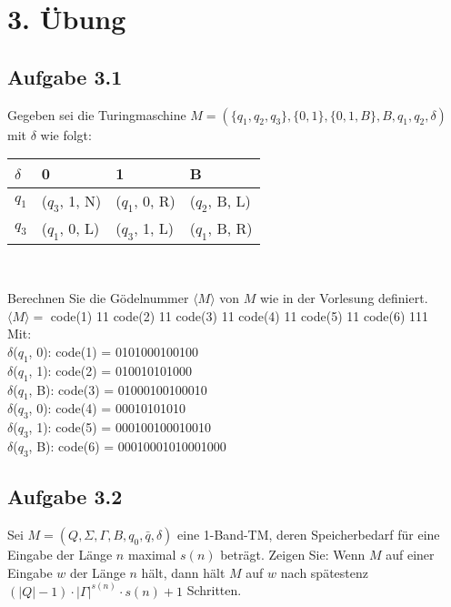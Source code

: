 \section*{3. Übung}
\subsection*{Aufgabe 3.1}
Gegeben sei die Turingmaschine $M=(\{q_1, q_2, q_3\}, \{0,1\}, \{0,1,B\}, B, q_1, q_2, \delta)$ mit $\delta$ wie folgt:
\begin{center}
	\begin{tabular}{l|lll}
		$\delta$ & \hspace{0.6cm}0 & \hspace{0.6cm}1 & \hspace{0.6cm}B \\ \hline
		$q_1$ & ($q_3$, 1, N) & ($q_1$, 0, R) & ($q_2$, B, L) \\
		$q_3$ & ($q_1$, 0, L) & ($q_3$, 1, L) & ($q_1$, B, R)
	\end{tabular}\\
\end{center}
Berechnen Sie die Gödelnummer $\langle M \rangle$ von $M$ wie in der Vorlesung definiert.
\\

$\langle M \rangle = $ code(1) 11 code(2) 11 code(3) 11 code(4) 11 code(5) 11 code(6) 111
\\

Mit:
\\
$\delta$($q_{1}$, 0): code(1) = 0101000100100
\\
$\delta$($q_{1}$, 1): code(2) = 010010101000
\\
$\delta$($q_{1}$, B): code(3) = 01000100100010
\\
$\delta$($q_{3}$, 0): code(4) = 00010101010
\\
$\delta$($q_{3}$, 1): code(5) = 000100100010010
\\
$\delta$($q_{3}$, B): code(6) = 00010001010001000
\\


\subsection*{Aufgabe 3.2}
Sei $M = (Q, \Sigma, \Gamma, B, q_0, \bar{q}, \delta)$ eine 1-Band-TM, deren Speicherbedarf für eine Eingabe der Länge $n$ maximal $s(n)$ beträgt. Zeigen Sie: Wenn $M$ auf einer Eingabe $w$ der Länge $n$ hält, dann hält $M$ auf $w$ nach spätestenz $(\left| Q\right| -1) \cdot \left| \Gamma\right|^{s(n)} \cdot s(n)+1$ Schritten.\\\\

